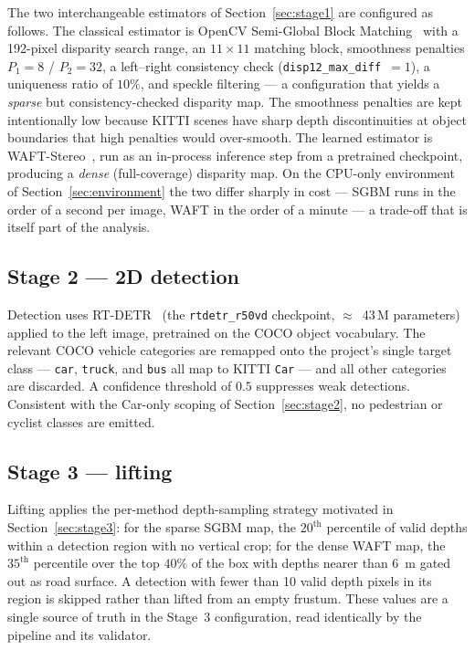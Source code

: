The two interchangeable estimators of Section~\ref{sec:stage1} are configured as
follows. The classical estimator is OpenCV Semi-Global Block
Matching~\cite{hirschmuller2008} with a 192-pixel disparity search range, an
$11\times11$ matching block, smoothness penalties $P_1=8$ / $P_2=32$, a left--right
consistency check (\texttt{disp12\_max\_diff}~$=1$), a uniqueness ratio of $10\%$,
and speckle filtering --- a configuration that yields a \emph{sparse} but
consistency-checked disparity map. The smoothness penalties are kept intentionally
low because KITTI scenes have sharp depth discontinuities at object boundaries that
high penalties would over-smooth. The learned estimator is
WAFT-Stereo~\cite{wang2026}, run as an in-process inference step from a pretrained
checkpoint, producing a \emph{dense} (full-coverage) disparity map. On the CPU-only
environment of Section~\ref{sec:environment} the two differ sharply in cost ---
SGBM runs in the order of a second per image, WAFT in the order of a minute --- a
trade-off that is itself part of the analysis.

\subsection{Stage 2 --- 2D detection}

Detection uses RT-DETR~\cite{lv2024} (the \texttt{rtdetr\_r50vd} checkpoint,
$\approx$~43\,M parameters) applied to the left image, pretrained on the COCO object
vocabulary. The relevant COCO vehicle categories are remapped onto the project's
single target class --- \texttt{car}, \texttt{truck}, and \texttt{bus} all map to
KITTI \texttt{Car} --- and all other categories are discarded. A confidence
threshold of $0.5$ suppresses weak detections. Consistent with the Car-only scoping
of Section~\ref{sec:stage2}, no pedestrian or cyclist classes are emitted.

\subsection{Stage 3 --- lifting}

Lifting applies the per-method depth-sampling strategy motivated in
Section~\ref{sec:stage3}: for the sparse SGBM map, the $20^{\text{th}}$ percentile of
valid depths within a detection region with no vertical crop; for the dense WAFT map,
the $35^{\text{th}}$ percentile over the top $40\%$ of the box with depths nearer than
6~m gated out as road surface. A detection with fewer than 10 valid depth pixels in
its region is skipped rather than lifted from an empty frustum. These values are a
single source of truth in the Stage~3 configuration, read identically by the
pipeline and its validator.

